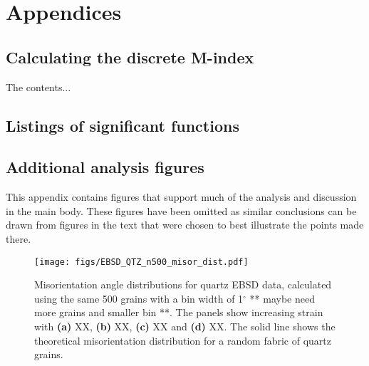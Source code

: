 \documentclass[a4paper,12pt]{report}
\numberwithin{equation}{chapter}
\begin{document}




\newpage
\appendix
\renewcommand{\thesection}{\Roman{section}}
\chapter{Appendices}

\section{Calculating the discrete M-index} \label{App:M-index_calc}
The contents...

\section{Listings of significant functions}

\section{Additional analysis figures}
This appendix contains figures that support much of the analysis and discussion in the main body. These figures have been omitted as similar conclusions can be drawn from figures in the text that were chosen to best illustrate the points made there. 

\begin{figure}[h]
  \centering
    \texttt{[image: figs/EBSD\_QTZ\_n500\_misor\_dist.pdf]}
  \caption[Misorientation angle distribution (quartz EBSD)]{Misorientation angle distributions for quartz EBSD data, calculated using the same 500 grains with a bin width of 1$^{\circ}$ ** maybe need more grains and smaller bin **. The panels show increasing strain with \textbf{(a)} XX, \textbf{(b)} XX, \textbf{(c)} XX and \textbf{(d)} XX. The solid line shows the theoretical misorientation distribution for a random fabric of quartz grains. } 
  \label{fig:APP_misor_dist_qtz_ebsd}
\end{figure} 
\end{document}
